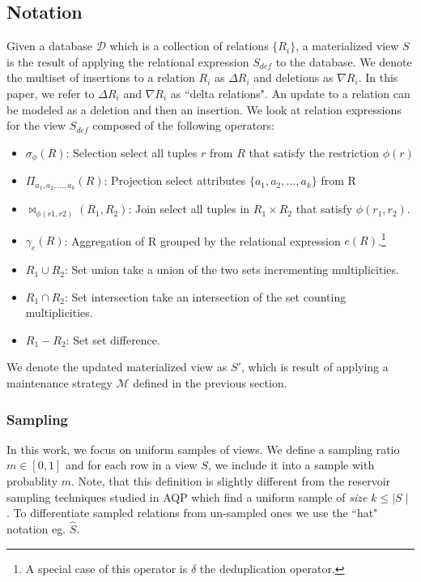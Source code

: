 \subsection{Notation}
Given a database $\mathcal{D}$ which is a collection of relations $\{R_i\}$, a materialized view $S$ is the result of applying the relational expression $S_{def}$ to the database.
We denote the multiset of insertions to a relation $R_i$ as $\Delta R_i$ and deletions as $\nabla R_i$.
In this paper, we refer to $\Delta R_i$ and $\nabla R_i$ as ``delta relations".
An update to a relation can be modeled as a deletion and then an insertion.
We look at relation expressions for the view $S_{def}$ composed of the following operators:
\begin{itemize}\vspace{-.45em}
\item $\sigma_{\phi}(R)$: Selection select all tuples $r$ from $R$ that satisfy the restriction $\phi (r)$ \vspace{-.45em}
\item $\Pi_{a_1,a_2,...,a_k}(R)$: Projection select attributes $\{a_1,a_2,...,a_k\}$ from R \vspace{-.45em}
\item $\bowtie_{\phi (r1,r2)}(R_1,R_2)$: Join select all tuples in $R_1 \times R_2$ that satisfy $\phi (r_1,r_2)$.
\item $\gamma_{e}(R)$: Aggregation of R grouped by the relational expression $e(R)$.\footnote{A special case of this operator is $\delta$ the deduplication operator.}\vspace{-.45em}
\item $R_1 \cup R_2$: Set union take a union of the two sets incrementing multiplicities.
\item $R_1 \cap R_2$: Set intersection take an intersection of the set counting multiplicities.
\item $R_1 - R_2$: Set set difference.
\end{itemize}
We denote the updated materialized view as $S'$, which is result of applying a maintenance strategy $\mathcal{M}$ defined in the previous section.


\subsubsection{Sampling}
In this work, we focus on uniform samples of views.
We define a sampling ratio $m\in [0,1]$ and for each row in a view $S$, we include it into a sample with probablity $m$.
Note, that this definition is slightly different from the reservoir sampling techniques studied in AQP which find a uniform
sample of \emph{size} $k\le \mid S \mid$.
To differentiate sampled relations from un-sampled ones we use the ``hat" notation eg. $\hat{S}$.

